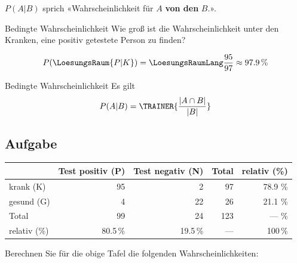 \begin{bemerkung}{}{}
  $P(A|B)$ sprich «Wahrscheinlichkeit für $A$ \textbf{von den} $B$.».

\end{bemerkung}

\begin{beispiel}{Bedingte Wahrscheinlichkeit}{}
  Wie groß ist die Wahrscheinlichkeit unter den Kranken, eine positiv
  getestete Person zu finden?

  \leserluft

  $$P(\LoesungsRaum{P|K})  = \LoesungsRaumLang{\frac{95}{97} \approx 97.9\,\%}$$
\end{beispiel}

\begin{gesetz}{Bedingte Wahrscheinlichkeit}{}
  Es gilt
  $$P(A|B) = \TRAINER{\frac{|A\cap B|}{|B|}}$$  
\end{gesetz}

\newpage


\subsection*{Aufgabe}

  \begin{tabular}{|l|r|r|r|r|}\hline
                 & Test positiv (P) & Test negativ (N)& Total & relativ (\%) \\\hline
    krank (K)    & 95               & 2               & 97    & 78.9 \%      \\\hline    
    gesund (G)   & 4                & 22              & 26    & 21.1 \%      \\\hline
    Total        & 99               & 24              & 123   &  --- \%      \\\hline
    relativ (\%) & 80.5\,\%           &19.5\,\%           & ---   &   100\,\%      \\\hline
  \end{tabular}

Berechnen Sie für die obige Tafel die folgenden Wahrscheinlichkeiten:


